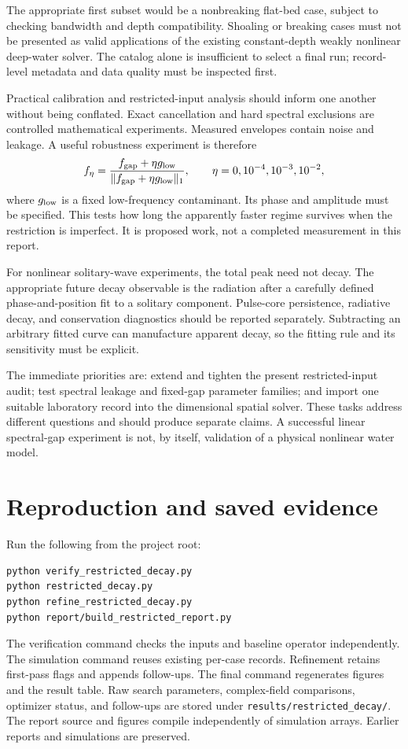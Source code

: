 \documentclass[10pt]{article}
\begin{document}
The appropriate first subset would be a nonbreaking flat-bed case, subject to checking bandwidth and depth compatibility. Shoaling or breaking cases must not be presented as valid applications of the existing constant-depth weakly nonlinear deep-water solver. The catalog alone is insufficient to select a final run; record-level metadata and data quality must be inspected first.

Practical calibration and restricted-input analysis should inform one another without being conflated. Exact cancellation and hard spectral exclusions are controlled mathematical experiments. Measured envelopes contain noise and leakage. A useful robustness experiment is therefore
\[
 f_\eta=\frac{f_{\rm gap}+\eta g_{\rm low}}{\|f_{\rm gap}+\eta g_{\rm low}\|_1},
 \qquad \eta=0,10^{-4},10^{-3},10^{-2},
\]
where $g_{\rm low}$ is a fixed low-frequency contaminant. Its phase and amplitude must be specified. This tests how long the apparently faster regime survives when the restriction is imperfect. It is proposed work, not a completed measurement in this report.

For nonlinear solitary-wave experiments, the total peak need not decay. The appropriate future decay observable is the radiation after a carefully defined phase-and-position fit to a solitary component. Pulse-core persistence, radiative decay, and conservation diagnostics should be reported separately. Subtracting an arbitrary fitted curve can manufacture apparent decay, so the fitting rule and its sensitivity must be explicit.

The immediate priorities are: extend and tighten the present restricted-input audit; test spectral leakage and fixed-gap parameter families; and import one suitable laboratory record into the dimensional spatial solver. These tasks address different questions and should produce separate claims. A successful linear spectral-gap experiment is not, by itself, validation of a physical nonlinear water model.

\section{Reproduction and saved evidence}
Run the following from the project root:
\begin{verbatim}
python verify_restricted_decay.py
python restricted_decay.py
python refine_restricted_decay.py
python report/build_restricted_report.py
\end{verbatim}
The verification command checks the inputs and baseline operator independently. The simulation command reuses existing per-case records. Refinement retains first-pass flags and appends follow-ups. The final command regenerates figures and the result table. Raw search parameters, complex-field comparisons, optimizer status, and follow-ups are stored under \texttt{results/restricted\_decay/}. The report source and figures compile independently of simulation arrays. Earlier reports and simulations are preserved.
\end{document}
